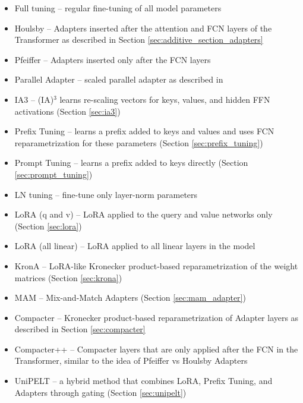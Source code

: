 \begin{itemize}

    \item Full tuning -- regular fine-tuning of all model parameters \item Houlsby -- Adapters inserted after the attention and FCN layers of the Transformer as described in Section \ref{sec:additive_section_adapters} \citep{adapters}
    \item Pfeiffer -- Adapters inserted only after the FCN layers \citep{modular_deep_learning}
    \item Parallel Adapter -- scaled parallel adapter as described in \citep{parallel_adapter}
    \item IA3 -- (IA)$^3$ learns re-scaling vectors for keys, values, and hidden FFN activations (Section \ref{sec:ia3}) \citep{}
    \item Prefix Tuning -- learns a prefix added to keys and values and uses FCN reparametrization for these parameters (Section \ref{sec:prefix_tuning}) \citep{prefix_tuning}
    \item Prompt Tuning -- learns a prefix added to keys directly (Section \ref{sec:prompt_tuning}) \citep{prompt_tuning}
    \item LN tuning -- fine-tune only layer-norm parameters \citep{layer_norm_tuning}
    \item LoRA (q and v) -- LoRA applied to the query and value networks only (Section \ref{sec:lora}) \citep{lora}
    \item LoRA (all linear) -- LoRA applied to all linear layers in the model \citep{lora}
    \item KronA -- LoRA-like Kronecker product-based reparametrization of the weight matrices (Section \ref{sec:krona}) \citep{krona}
    \item MAM -- Mix-and-Match Adapters (Section \ref{sec:mam_adapter}) \citep{}
    \item Compacter -- Kronecker product-based reparametrization of Adapter layers as described in Section \ref{sec:compacter} \citep{compacter}
    \item Compacter++ -- Compacter layers that are only applied after the FCN in the Transformer, similar to the idea of Pfeiffer vs Houlsby Adapters \citep{}
    \item UniPELT -- a hybrid method that combines LoRA, Prefix Tuning, and Adapters through gating (Section \ref{sec:unipelt}) \citep{unipelt}
\end{itemize}

